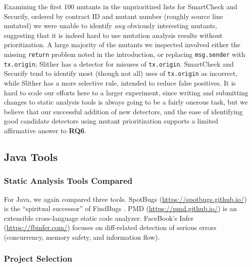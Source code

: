 Examining the first 100 mutants in the unprioritized lists for SmartCheck and Securify, ordered by contract ID and mutant number (roughly source line mutated) we were unable to identify \emph{any} obviously interesting mutants, suggesting that it is indeed hard to use mutation analysis results without prioritization. A large majority of the mutants we inspected involved either the missing
{\tt return} problem noted in the introduction, or replacing {\tt msg.sender} with {\tt tx.origin}; Slither has a detector for misuses of {\tt tx.origin}.  SmartCheck and Securify tend to identify most (though not all) uses of {\tt tx.origin} as incorrect, while Slither has a more selective rule, intended to reduce false positives.
It is hard to scale our efforts here to a larger experiment, since writing and submitting changes to static analysis tools is always going to be a fairly onerous task, but we believe that our successful addition of new detectors, and the ease of identifying good candidate detectors using mutant prioritization supports a limited affirmative answer to {\bf RQ6}.

\subsection{Java Tools}

\subsubsection{Static Analysis Tools Compared}

For Java, we again compared three tools.  SpotBugs (\url{https://spotbugs.github.io/}) is the ``spiritual successor'' of FindBugs \cite{FindBugs,CompareJavaTools}.  PMD (\url{https://pmd.github.io/}) \cite{CompareJavaTools} is an extensible cross-language static code analyzer.  FaceBook's Infer (\url{https://fbinfer.com/}) \cite{Infer} focuses on diff-related detection of serious errors (concurrency, memory safety, and information flow).

\subsubsection{Project Selection}

